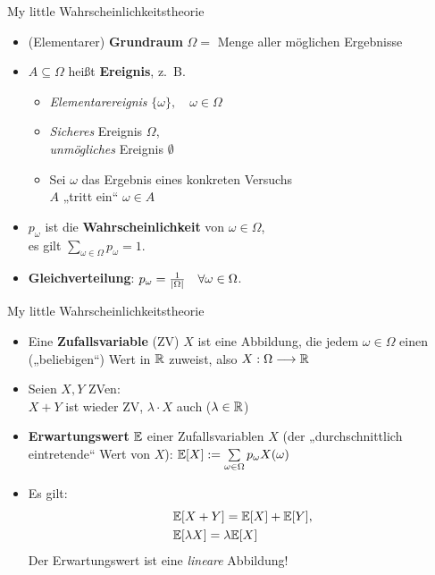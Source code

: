 \begin{frame}{My little Wahrscheinlichkeitstheorie}
	\begin{itemize}
		\item (Elementarer) \textbf{Grundraum} $\Omega =$ Menge aller möglichen Ergebnisse
		\item $A \subseteq \Omega$ heißt \textbf{Ereignis}, z.~B.
		\begin{itemize}
			\item \textit{Elementarereignis} $\{\omega\}, \quad  \omega \in \Omega$
			\item \textit{Sicheres} Ereignis $\Omega$, \\ \textit{unmögliches} Ereignis $\emptyset$
			\item Sei $\omega$ das Ergebnis eines konkreten Versuchs \\ 
			\Impl $A$ „tritt ein“ \gdw $\omega \in A$
		\end{itemize}
		\item $p_\omega$ ist die \textbf{Wahrscheinlichkeit} von $\omega \in \Omega$, \\ es gilt $\sum\limits_{\omega \in \Omega} p_\omega = 1$.
		\item \textbf{Gleichverteilung}: $p_\omega = \frac{1}{\left|\Omega\right|} \quad \forall \omega \in \Omega$.	
	\end{itemize}
\end{frame}

\begin{frame}{My little Wahrscheinlichkeitstheorie}
	\begin{itemize}
		\item Eine \textbf{Zufallsvariable} (ZV) $X$ ist eine Abbildung, die jedem $\omega \in \Omega$ einen („beliebigen“) Wert in $\mathbb{R}$ zuweist, also $X: \Omega \longrightarrow \mathbb{R}$
		\item Seien $X, Y$ ZVen: \\ $X+Y$ ist wieder ZV, \quad $\lambda \cdot X$ auch ($\lambda \in \mathbb{R}$)
		\pause
		\item \textbf{Erwartungswert} $\mathbb{E}$ einer Zufallsvariablen $X$ (der „durchschnittlich eintretende“ Wert von $X$): $\mathbb{E}[X] := \sum\limits_{\omega \in \Omega} p_\omega X(\omega)$
		\item Es gilt:
		\begin{align*}
			&\mathbb{E}[X+Y] = \mathbb{E}[X] + \mathbb{E}[Y], \\
			&\mathbb{E}[\lambda X] = \lambda \mathbb{E}[X]
		\end{align*}
		\pause
		\Impl Der Erwartungswert ist eine \textit{lineare} Abbildung!
	\end{itemize}
\end{frame}

